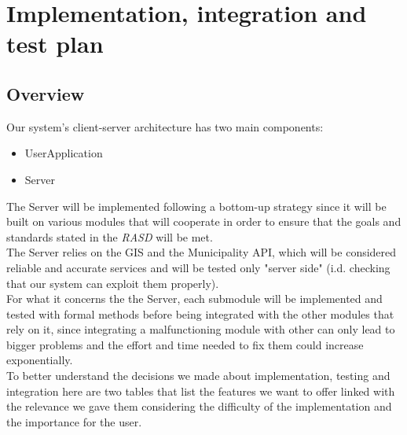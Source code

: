 \section{Implementation, integration and test plan}

    \subsection{Overview}

        Our system's client-server architecture has two main components:
        \begin{itemize}           
            \item UserApplication
            \item Server
        \end{itemize}
        
        The Server will be implemented following a bottom-up strategy since it will be built on various modules that will cooperate in order
        to ensure that the goals and standards stated in the \emph{RASD}\cite{RASD} will be met.\\
        The Server relies on the GIS and the Municipality API, which will be considered reliable and accurate services and will be
        tested only "server side" (i.d. checking that our system can exploit them properly).\\
        For what it concerns the the Server, each submodule will be implemented and tested with formal methods before being integrated 
        with the other modules that rely on it, since integrating a malfunctioning module with other can only lead to bigger problems 
        and the effort and time needed to fix them could increase exponentially.\\
        To better understand the decisions we made about implementation, testing and integration here are two tables that list the features
        we want to offer linked with the relevance we gave them considering the difficulty of the implementation and the importance for 
        the user.\\

